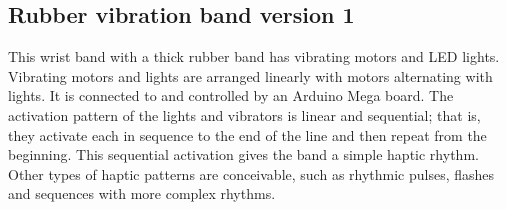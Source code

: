 \documentclass{chi-ext}
\begin{document}
%
%
%

\subsection{Rubber vibration band version 1}
This wrist band with a thick rubber band has vibrating motors and LED lights. Vibrating motors and lights are arranged linearly with motors alternating with lights. It is connected to and controlled by an Arduino Mega board. The activation pattern of the lights and vibrators is linear and sequential; that is, they activate each in sequence to the end of the line and then repeat from the beginning. This sequential activation gives the band a simple haptic rhythm. Other types of haptic patterns are conceivable, such as rhythmic pulses, flashes and sequences with more complex rhythms. 
\end{document}
